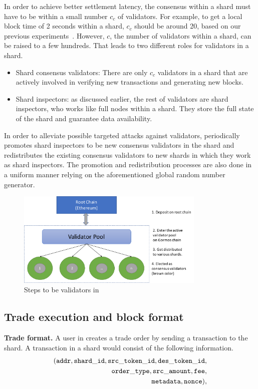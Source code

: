 In order to achieve better settlement latency, the consensus within a shard must have to be within a small number $c_c$ of validators. For example, to get a local block time of 2 seconds within a shard, $c_c$ should be around 20, based on our previous experiments~\cite{elastico}. However, $c$, the number of validators within a shard, can be raised to a few hundreds. That leads to two different roles for validators in a shard.
\begin{itemize}
\item Shard consensus validators: There are only $c_c$ validators in a shard that are actively involved in verifying new transactions and generating new blocks.
\item Shard inspectors: as discussed earlier, the rest of validators are shard inspectors, who works like full nodes within a shard. They store the full state of the shard and guarantee data availability.
\end{itemize}

In order to alleviate possible targeted attacks against validators, \codename periodically promotes shard inspectors to be new consensus validators in the shard and redistributes the existing consensus validators to new shards in which they work as shard inspectors. The promotion and redistribution processes are also done in a uniform manner relying on the aforementioned global random number generator.

\begin{figure}[t]
  \centering
  \includegraphics[width=0.8\textwidth]{images/validator}
  \caption{Steps to be validators in \codename}
  \label{fig:validator}
\end{figure}

\subsection{Trade execution and block format}

\textbf{Trade format.} A user in \codename creates a trade order by sending a transaction to the shard. A transaction in a shard would consist of the following information.
\begin{align*}
({\mathtt{addr}}, {\mathtt{shard\_id}}, {\mathtt{src\_token\_id}}, {\mathtt{des\_token\_id}}, \\ {\mathtt{order\_type}}, {\mathtt{src\_amount}}, {\mathtt{fee}}, \\ {\mathtt{metadata}}, {\mathtt{nonce}}),
\end{align*}

